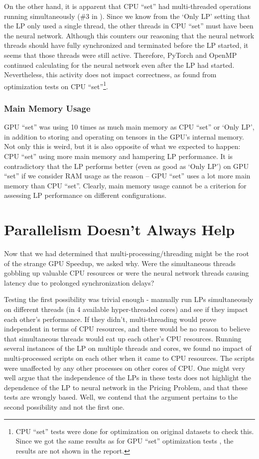 On the other hand, it is apparent that CPU ``set'' had multi-threaded operations running simultaneously (\#3 in ). Since we know from the `Only LP' setting that the LP only used a single thread, the other threads in CPU ``set'' must have been the neural network. Although this counters our reasoning that the neural network threads should have fully synchronized and terminated before the LP started, it seems that those threads were still active. Therefore, PyTorch and OpenMP continued calculating for the neural network even after the LP had started. Nevertheless, this activity does not impact correctness, as found from optimization tests on CPU ``set''\footnote{CPU ``set'' tests were done for optimization on original datasets to check this. Since we got the same results as for GPU ``set'' optimization tests , the results are not shown in the report.}.

\subsubsection{Main Memory Usage}
GPU ``set'' was using 10 times as much main memory as CPU ``set'' or `Only LP', in addition to storing and operating on tensors in the GPU's internal memory. Not only this is weird, but it is also opposite of what we expected to happen: CPU ``set'' using more main memory and hampering LP performance. It is contradictory that the LP performs better (even as good as `Only LP') on GPU ``set'' if we consider RAM usage as the reason -- GPU ``set'' uses a lot more main memory than CPU ``set''. Clearly, main memory usage cannot be a criterion for assessing LP performance on different configurations.

\section{Parallelism Doesn't Always Help} \label{app:Parallelism Doesn't Always Help}
Now that we had determined that multi-processing/threading might be the root of the strange GPU Speedup, we asked why. Were the simultaneous threads gobbling up valuable CPU resources or were the neural network threads causing latency due to prolonged synchronization delays?

Testing the first possibility was trivial enough - manually run LPs simultaneously on different threads (in 4 available hyper-threaded cores) and see if they impact each other's performance. If they didn't, multi-threading would prove independent in terms of CPU resources, and there would be no reason to believe that simultaneous threads would eat up each other's CPU resources. Running several instances of the LP on multiple threads and cores, we found no impact of multi-processed scripts on each other when it came to CPU resources. The scripts were unaffected by any other processes on other cores of CPU. One might very well argue that the independence of the LPs in these tests does not highlight the dependence of the LP to neural network in the Pricing Problem, and that these tests are wrongly based. Well, we contend that the argument pertains to the second possibility and not the first one. 

